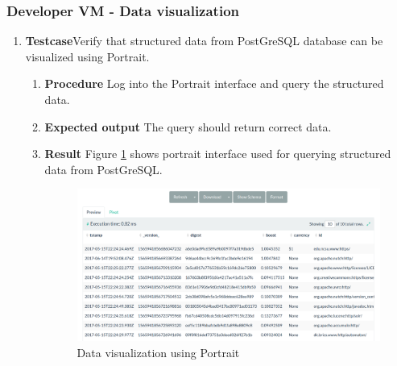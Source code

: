 \subsubsection{Developer VM - Data visualization}
\begin{enumerate}
\item \textbf{Testcase}\newline Verify that structured data from
  PostGreSQL database can be visualized using Portrait.
  \begin{enumerate}[label={}]
  \item \textbf{Procedure}\newline
    Log into the Portrait interface and query the structured data.
  \item \textbf{Expected output}\newline
    The query should return correct data.
  \item \textbf{Result}\newline
    Figure \ref{explorer} shows portrait interface used for querying
    structured data from PostGreSQL.
    \begin{figure}
      \centering
      \includegraphics[scale=0.27]{screenshots/explorer.png}
      \caption{Data visualization using Portrait}
      \label{explorer}
    \end{figure}
  \end{enumerate}
\end{enumerate}


